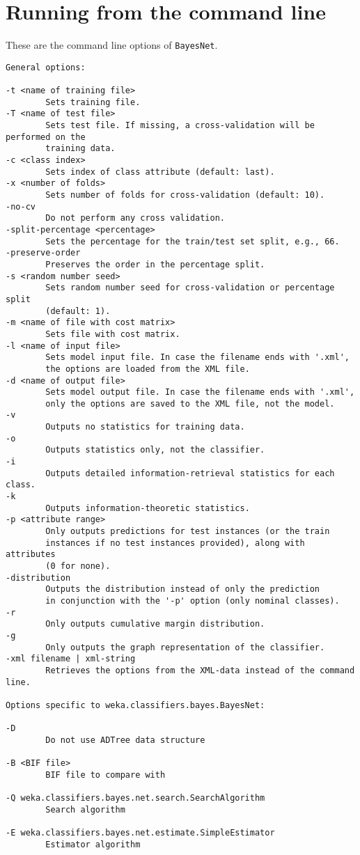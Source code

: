 \begin{center}
\end{center}

\section{Running from the command line}
These are the command line options of {\tt BayesNet}.

{\small
\begin{verbatim}
General options:

-t <name of training file>
        Sets training file.
-T <name of test file>
        Sets test file. If missing, a cross-validation will be performed on the 
        training data.
-c <class index>
        Sets index of class attribute (default: last).
-x <number of folds>
        Sets number of folds for cross-validation (default: 10).
-no-cv
        Do not perform any cross validation.
-split-percentage <percentage>
        Sets the percentage for the train/test set split, e.g., 66.
-preserve-order
        Preserves the order in the percentage split.
-s <random number seed>
        Sets random number seed for cross-validation or percentage split
        (default: 1).
-m <name of file with cost matrix>
        Sets file with cost matrix.
-l <name of input file>
        Sets model input file. In case the filename ends with '.xml',
        the options are loaded from the XML file.
-d <name of output file>
        Sets model output file. In case the filename ends with '.xml',
        only the options are saved to the XML file, not the model.
-v
        Outputs no statistics for training data.
-o
        Outputs statistics only, not the classifier.
-i
        Outputs detailed information-retrieval statistics for each class.
-k
        Outputs information-theoretic statistics.
-p <attribute range>
        Only outputs predictions for test instances (or the train
        instances if no test instances provided), along with attributes
        (0 for none).
-distribution
        Outputs the distribution instead of only the prediction
        in conjunction with the '-p' option (only nominal classes).
-r
        Only outputs cumulative margin distribution.
-g
        Only outputs the graph representation of the classifier.
-xml filename | xml-string
        Retrieves the options from the XML-data instead of the command line.

Options specific to weka.classifiers.bayes.BayesNet:

-D
        Do not use ADTree data structure

-B <BIF file>
        BIF file to compare with

-Q weka.classifiers.bayes.net.search.SearchAlgorithm
        Search algorithm

-E weka.classifiers.bayes.net.estimate.SimpleEstimator
        Estimator algorithm
        
\end{verbatim}
}

